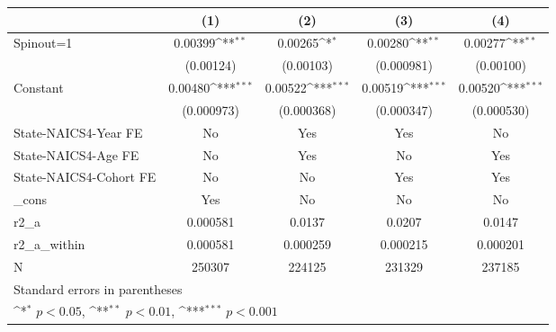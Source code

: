 {
\def\sym#1{\ifmmode^{#1}\else\(^{#1}\)\fi}
\begin{tabular}{l*{4}{c}}
\hline\hline
                    &\multicolumn{1}{c}{(1)}         &\multicolumn{1}{c}{(2)}         &\multicolumn{1}{c}{(3)}         &\multicolumn{1}{c}{(4)}         \\
\hline
Spinout=1           &     0.00399\sym{**} &     0.00265\sym{*}  &     0.00280\sym{**} &     0.00277\sym{**} \\
                    &   (0.00124)         &   (0.00103)         &  (0.000981)         &   (0.00100)         \\
[1em]
Constant            &     0.00480\sym{***}&     0.00522\sym{***}&     0.00519\sym{***}&     0.00520\sym{***}\\
                    &  (0.000973)         &  (0.000368)         &  (0.000347)         &  (0.000530)         \\
[1em]
State-NAICS4-Year FE&          No         &         Yes         &         Yes         &          No         \\
[1em]
State-NAICS4-Age FE &          No         &         Yes         &          No         &         Yes         \\
[1em]
State-NAICS4-Cohort FE&          No         &          No         &         Yes         &         Yes         \\
[1em]
\_cons              &         Yes         &          No         &          No         &          No         \\
\hline
r2\_a                &    0.000581         &      0.0137         &      0.0207         &      0.0147         \\
r2\_a\_within         &    0.000581         &    0.000259         &    0.000215         &    0.000201         \\
N                   &      250307         &      224125         &      231329         &      237185         \\
\hline\hline
\multicolumn{5}{l}{\footnotesize Standard errors in parentheses}\\
\multicolumn{5}{l}{\footnotesize \sym{*} \(p<0.05\), \sym{**} \(p<0.01\), \sym{***} \(p<0.001\)}\\
\end{tabular}
}
